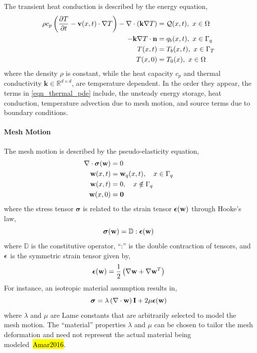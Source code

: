 The transient heat conduction is described by the energy equation,
\begin{subequations}
    \begin{align}
        \rho c_p\left(\ppt{T} - \mathbf{v}(x,t)\cdot\nabla T\right) - \nabla\cdot (\mathbf{k}\nabla T) &= \cQ(x,t),\ x\in\Omega \label{eqn_thermal_pde}\\
        -\mathbf{k}\nabla T\cdot \vn &= q_b(x,t),\ x\in\Gamma_q\label{eqn_thermal_bc_neumann}\\
        T(x,t) &= T_b(x,t),\ x\in\Gamma_T\label{eqn_thermal_bc_dirichlet}\\
        T(x,0) &= T_0(x),\ x\in\Omega\label{eqn_thermal_ic}
    \end{align}\label{eqn_governing_equations}
\end{subequations}
where the density $\rho$ is constant, while the heat capacity $c_p$ and thermal conductivity $\mathbf{k}\in\mathbb{R}^{d\times d}$, are temperature dependent. In the order they appear, the terms in \cref{eqn_thermal_pde} include, the unsteady energy storage, heat conduction, temperature advection due to mesh motion, and source terms due to boundary conditions.

\paragraph*{Mesh Motion} The mesh motion is described by the pseudo-elasticity equation,
\begin{subequations}
    \begin{align}
        \nabla\cdot\boldsymbol{\sigma}(\mathbf{w}) &= 0\label{eqn_elasticity_pde}\\
        \mathbf{w}(x,t) &= \mathbf{w}_q(x,t),\quad x\in\Gamma_q\label{eqn_displacement_heated_bc}\\
        \mathbf{w}(x,t) &= 0,\quad x\notin \Gamma_q\label{eqn_displacement_unheated_bc}\\
        \mathbf{w}(x,0) &= \boldsymbol{0}\label{eqn_displacement_initial_condition}
    \end{align}
\end{subequations}
where the stress tensor $\boldsymbol{\sigma}$ is related to the strain tensor $\boldsymbol{\epsilon}(\mathbf{w})$ through Hooke's law,
\[
    \boldsymbol{\sigma}(\mathbf{w}) = \mathbb{D}:\boldsymbol{\epsilon}(\mathbf{w})
\]
where $\mathbb{D}$ is the constitutive operator, ``:'' is the double contraction of tensors, and $\boldsymbol{\epsilon}$ is the symmetric strain tensor given by,
\[
    \boldsymbol{\epsilon}(\mathbf{w}) = \frac{1}{2}\left(\nabla\mathbf{w} + \nabla\mathbf{w}^T\right)
\]
For instance, an isotropic material assumption results in,
\[
    \boldsymbol{\sigma} = \lambda\left(\nabla\cdot\mathbf{w}\right) \mathbf{I} + 2\mu\boldsymbol{\epsilon}(\mathbf{w})
\]
where $\lambda$ and $\mu$ are Lame constants that are arbitrarily selected to model the mesh motion. The ``material'' properties $\lambda$ and $\mu$ can be chosen to tailor the mesh deformation and need not represent the actual material being modeled~\hl{Amar2016}. 

